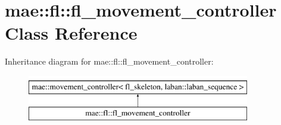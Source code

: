 \hypertarget{classmae_1_1fl_1_1fl__movement__controller}{\section{mae\-:\-:fl\-:\-:fl\-\_\-movement\-\_\-controller Class Reference}
\label{classmae_1_1fl_1_1fl__movement__controller}
}
Inheritance diagram for mae\-:\-:fl\-:\-:fl\-\_\-movement\-\_\-controller\-:\begin{figure}[H]
\begin{center}
\leavevmode
\includegraphics[height=2.000000cm]{classmae_1_1fl_1_1fl__movement__controller}
\end{center}
\end{figure}
